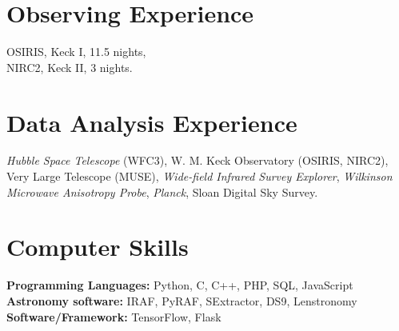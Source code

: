 \documentclass[margin, line]{res}
\newenvironment{list2}{
  \begin{list}{$\bullet$}{%
      \setlength{\itemsep}{0in}
      \setlength{\parsep}{0in} \setlength{\parskip}{0in}
      \setlength{\topsep}{0in} \setlength{\partopsep}{0in} 
      \setlength{\leftmargin}{0.2in}}}{\end{list}}
\begin{document}
\begin{resume}
\section{\sc Observing Experience}
OSIRIS, Keck I, 11.5 nights,\\
NIRC2, Keck II, 3 nights. 


\section{\sc Data Analysis Experience}
\textit{Hubble Space Telescope} (WFC3), 
W. M. Keck Observatory (OSIRIS, NIRC2),
Very Large Telescope (MUSE),
{\it Wide-field Infrared Survey Explorer},
{\it Wilkinson Microwave Anisotropy Probe},
{\it Planck},
Sloan Digital Sky Survey.

%
%
%


\section{\sc Computer Skills} 
\textbf{Programming Languages:} Python, C, C++, PHP, SQL, JavaScript \\
\textbf{Astronomy software:} IRAF, PyRAF, SExtractor, DS9, Lenstronomy \\
\textbf{Software/Framework:} TensorFlow, Flask




\end{resume}
\end{document}
